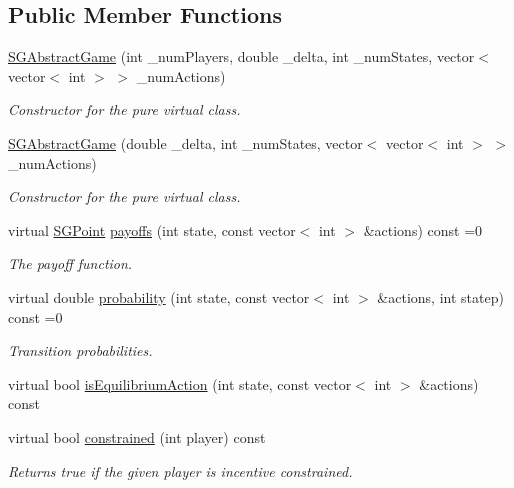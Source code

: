 \subsection*{Public Member Functions}
\begin{DoxyCompactItemize}
\item 
\mbox{\label{classSGAbstractGame_a7a804027e8f7d5f718c78ffef6ef9195}} 
\hyperlink{classSGAbstractGame_a7a804027e8f7d5f718c78ffef6ef9195}{S\+G\+Abstract\+Game} (int \+\_\+num\+Players, double \+\_\+delta, int \+\_\+num\+States, vector$<$ vector$<$ int $>$ $>$ \+\_\+num\+Actions)
\begin{DoxyCompactList}\small\item\em Constructor for the pure virtual class. \end{DoxyCompactList}\item 
\hyperlink{classSGAbstractGame_aa4d3130442e99f23f0ec78526629f0b4}{S\+G\+Abstract\+Game} (double \+\_\+delta, int \+\_\+num\+States, vector$<$ vector$<$ int $>$ $>$ \+\_\+num\+Actions)
\begin{DoxyCompactList}\small\item\em Constructor for the pure virtual class. \end{DoxyCompactList}\item 
virtual \hyperlink{classSGPoint}{S\+G\+Point} \hyperlink{classSGAbstractGame_a3fc1cd009d1813f44f1f219e7deb6eef}{payoffs} (int state, const vector$<$ int $>$ \&actions) const =0
\begin{DoxyCompactList}\small\item\em The payoff function. \end{DoxyCompactList}\item 
virtual double \hyperlink{classSGAbstractGame_a416b31d5020b75de49447ce4f7783b98}{probability} (int state, const vector$<$ int $>$ \&actions, int statep) const =0
\begin{DoxyCompactList}\small\item\em Transition probabilities. \end{DoxyCompactList}\item 
virtual bool \hyperlink{classSGAbstractGame_a2cec8147c3055cfe6314da349d1a7344}{is\+Equilibrium\+Action} (int state, const vector$<$ int $>$ \&actions) const
\item 
virtual bool \hyperlink{classSGAbstractGame_abd2542c0b2db7ed40d307f7f0a53048b}{constrained} (int player) const
\begin{DoxyCompactList}\small\item\em Returns true if the given player is incentive constrained. \end{DoxyCompactList}\item 

\end{DoxyCompactItemize}
